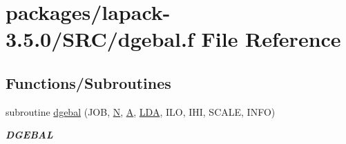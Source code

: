 \hypertarget{dgebal_8f}{}\section{packages/lapack-\/3.5.0/\+S\+R\+C/dgebal.f File Reference}
\label{dgebal_8f}
\subsection*{Functions/\+Subroutines}
\begin{DoxyCompactItemize}
\item 
subroutine \hyperlink{group__doubleGEcomputational_ga411292dd693c20ff9c27650fb7bddf85}{dgebal} (J\+O\+B, \hyperlink{polmisc_8c_a0240ac851181b84ac374872dc5434ee4}{N}, \hyperlink{classA}{A}, \hyperlink{example__user_8c_ae946da542ce0db94dced19b2ecefd1aa}{L\+D\+A}, I\+L\+O, I\+H\+I, S\+C\+A\+L\+E, I\+N\+F\+O)
\begin{DoxyCompactList}\small\item\em {\bfseries D\+G\+E\+B\+A\+L} \end{DoxyCompactList}\end{DoxyCompactItemize}
